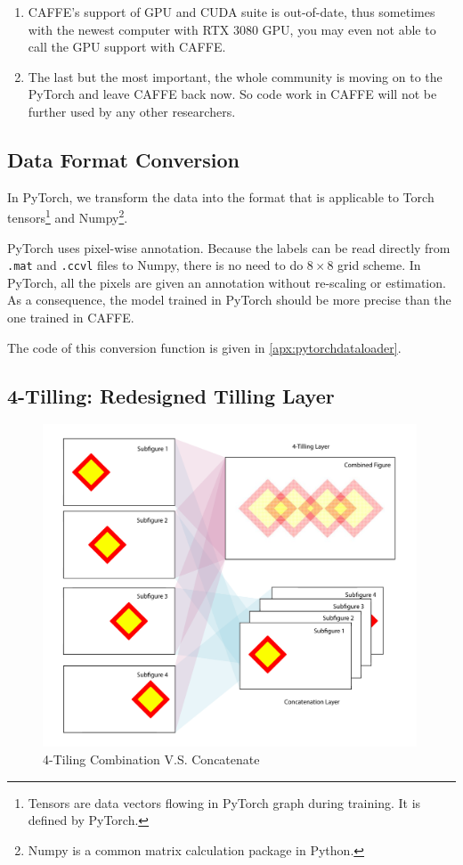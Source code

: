 \begin{spacing}{1.5}
\begin{enumerate}
    \item CAFFE's support of GPU and CUDA suite is out-of-date, thus sometimes with the newest computer with RTX 3080 GPU, you may even not able to call the GPU support with CAFFE. 

    \item The last but the most important, the whole community is moving on to the PyTorch and leave CAFFE back now. So code work in CAFFE will not be further used by any other researchers.
    
\end{enumerate}

\subsection{Data Format Conversion}

In PyTorch, we transform the data into the format that is applicable to Torch tensors\footnote{Tensors are data vectors flowing in PyTorch graph during training. It is defined by PyTorch.} and Numpy\footnote{Numpy is a common matrix calculation package in Python.}. 

PyTorch uses pixel-wise annotation. Because the labels can be read directly from \texttt{.mat} and \texttt{.ccvl} files to Numpy, there is no need to do $8 \times 8$ grid scheme. In PyTorch, all the pixels are given an annotation without re-scaling or estimation. As a consequence, the model trained in PyTorch should be more precise than the one trained in CAFFE.

The code of this conversion function is given in \autoref{apx:pytorchdataloader}.

\subsection{4-Tilling: Redesigned Tilling Layer}

\begin{figure}[ht]
\centering
\includegraphics[width=0.99\textwidth, fbox]{Chapter3/fourtiling.pdf}
\caption{4-Tiling Combination V.S. Concatenate}
\label{fig:fourtiling} 
\end{figure}


\end{spacing}
